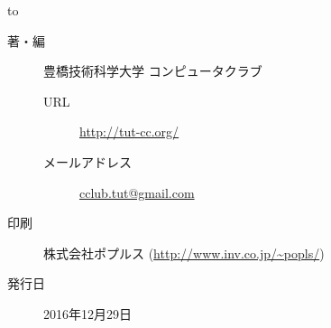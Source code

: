 \pagestyle{empty}
\makeatletter
\hbox to\z@{\hss}
\makeatother
\clearpage
{}
\begin{flushright}
	\begin{description}
		\item[著・編] 豊橋技術科学大学 コンピュータクラブ
			\begin{description}
				\item[URL] \url{http://tut-cc.org/}
				\item[メールアドレス] \url{cclub.tut@gmail.com}
			\end{description}
		\item[印刷] 株式会社ポプルス (\url{http://www.inv.co.jp/~popls/})
		\item[発行日] 2016年12月29日
	\end{description}
\end{flushright}
